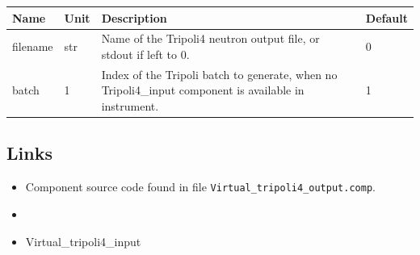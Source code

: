 \begin{longtable}{p{}p{}p{}p{}}
\toprule
\textbf{Name} & \textbf{Unit} & \textbf{Description} & \textbf{Default} \\
\midrule
\endhead
filename & str & Name of the Tripoli4 neutron output file, or stdout if left to 0. & 0 \\
batch & 1 & Index of the Tripoli batch to generate, when no Tripoli4\_input component is available in instrument. & 1 \\
\bottomrule
\end{longtable}

\subsection*{Links}
\begin{itemize}
  \item Component source code found in file \texttt{Virtual\_tripoli4\_output.comp}.
  \item {}
  \item Virtual\_tripoli4\_input
\end{itemize}
